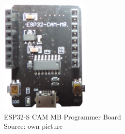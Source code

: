 \begin{figure}[H]
\centering
\includegraphics[width=0.4\textwidth]{ESP32-CAM-MB-programmer}
\caption[ESP32-S-CAM]{ESP32-S CAM MB Programmer Board \\ Source: own picture}
\label{ESP32-S-CAM-overview}
\end{figure}